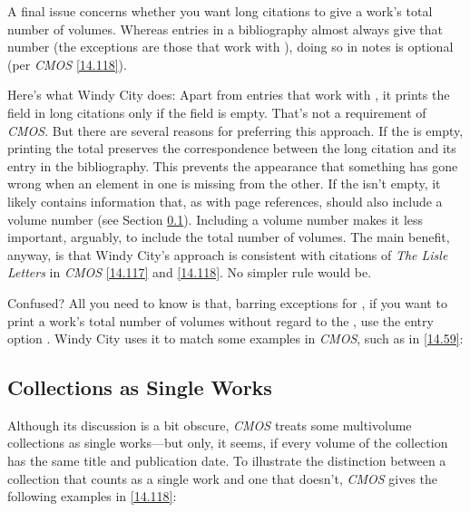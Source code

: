 \documentclass[11pt,letterpaper,oneside]{article}
\begin{document}
\begin{refonly}
\nocite{armstrong2014}
\end{refonly}

A final issue concerns whether you want long citations to give a
work's total number of volumes. Whereas entries in a bibliography
almost always give that number (the exceptions are those that work
with ), doing so in notes is optional (per \textit{CMOS}
\ref{14.118}).

Here's what Windy City does: Apart from entries that work with
, it prints the  field in long
citations only if the  field is empty. That's not a
requirement of \textit{CMOS}. But there are several reasons for
preferring this approach. If the  is empty,
printing the total preserves the correspondence between the long
citation and its entry in the bibliography. This prevents the
appearance that something has gone wrong when an element in one is
missing from the other. If the  isn't empty, it
likely contains information that, as with page references, should also
include a volume number (see Section \ref{multivolume}). Including a
volume number makes it less important, arguably, to include the total
number of volumes. The main benefit, anyway, is that Windy City's
approach is consistent with citations of \textit{The Lisle Letters} in
\textit{CMOS} \ref{14.117} and \ref{14.118}. No simpler rule would be.

Confused? All you need to know is that, barring exceptions for
, if you want to print a work's total number of volumes
without regard to the , use the entry option
. Windy City uses it to match some examples in
\textit{CMOS}, such as in \ref{14.59}:

\begin{citeonly}
\item \cite[1:126]{shurtleff1853}
\end{citeonly}

\subsection{Collections as Single Works}
\label{multivolume}

Although its discussion is a bit obscure, \textit{CMOS} treats some
multivolume collections as single works---but only, it seems, if every
volume of the collection has the same title and publication date. To
illustrate the distinction between a collection that counts as a
single work and one that doesn't, \textit{CMOS} gives the following
examples in \ref{14.118}:
\end{document}
